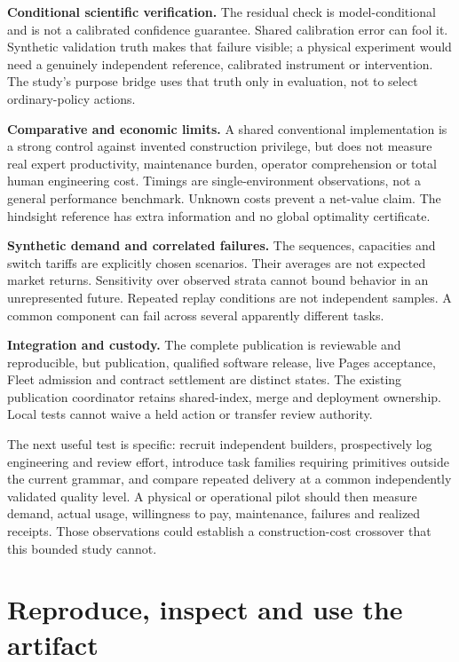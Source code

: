 \documentclass[11pt,letterpaper]{article}
\begin{document}
\textbf{Conditional scientific verification.} The residual check is model-conditional and is not a calibrated confidence guarantee. Shared calibration error can fool it. Synthetic validation truth makes that failure visible; a physical experiment would need a genuinely independent reference, calibrated instrument or intervention. The study's purpose bridge uses that truth only in evaluation, not to select ordinary-policy actions.

\textbf{Comparative and economic limits.} A shared conventional implementation is a strong control against invented construction privilege, but does not measure real expert productivity, maintenance burden, operator comprehension or total human engineering cost. Timings are single-environment observations, not a general performance benchmark. Unknown costs prevent a net-value claim. The hindsight reference has extra information and no global optimality certificate.

\textbf{Synthetic demand and correlated failures.} The sequences, capacities and switch tariffs are explicitly chosen scenarios. Their averages are not expected market returns. Sensitivity over observed strata cannot bound behavior in an unrepresented future. Repeated replay conditions are not independent samples. A common component can fail across several apparently different tasks.

\textbf{Integration and custody.} The complete publication is reviewable and reproducible, but publication, qualified software release, live Pages acceptance, Fleet admission and contract settlement are distinct states. The existing publication coordinator retains shared-index, merge and deployment ownership. Local tests cannot waive a held action or transfer review authority.

The next useful test is specific: recruit independent builders, prospectively log engineering and review effort, introduce task families requiring primitives outside the current grammar, and compare repeated delivery at a common independently validated quality level. A physical or operational pilot should then measure demand, actual usage, willingness to pay, maintenance, failures and realized receipts. Those observations could establish a construction-cost crossover that this bounded study cannot.

\section{Reproduce, inspect and use the artifact}
\end{document}
